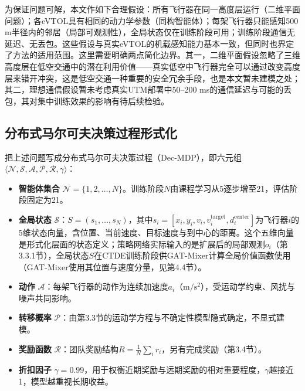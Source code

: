 \documentclass[12pt,a4paper,UTF8]{ctexart}
\begin{document}
为保证问题可解，本文作如下合理假设：所有飞行器在同一高度层运行（二维平面问题）；各eVTOL具有相同的动力学参数（同构智能体）；每架飞行器只能感知500 m半径内的邻居（局部可观测性），全局状态仅在训练阶段可用；训练阶段通信无延迟、无丢包。这些假设与真实eVTOL的机载感知能力基本一致，但同时也界定了方法的适用范围。这里需要明确两点简化边界。其一，二维平面假设忽略了三维高度层在低空交通中的潜在利用价值——真实低空中飞行器完全可以通过改变高度层来错开冲突，这是低空交通一种重要的安全冗余手段，也是本文暂未建模之处；其二，理想通信假设暂未考虑真实UTM部署中50--200 ms的通信延迟与可能的丢包，其对集中训练效果的影响有待后续检验。

\subsection{分布式马尔可夫决策过程形式化}

把上述问题写成分布式马尔可夫决策过程（Dec-MDP）\cite{ref41}，即六元组$\langle \mathcal{N}, \allowbreak \mathcal{S}, \allowbreak \mathcal{A}, \allowbreak \mathcal{P}, \allowbreak \mathcal{R}, \allowbreak \gamma \rangle$：

\begin{itemize}
    \item \textbf{智能体集合} $\mathcal{N} = \{1, 2, \ldots, N\}$。训练阶段$N$由课程学习从5逐步增至21，评估阶段固定为21。
    \item \textbf{全局状态} $\mathcal{S}$：$S = (s_1, \ldots, s_N)$，其中$s_i = [x_i, y_i, v_i, v_i^{\text{target}}, d_i^{\text{center}}]$为飞行器$i$的5维状态向量，含位置、当前速度、目标速度与到中心的距离。这个五维向量是形式化层面的状态定义；策略网络实际输入的是扩展后的局部观测$o_i$（第3.3.1节），全局状态$S$在CTDE训练阶段供GAT-Mixer计算全局价值函数使用（GAT-Mixer使用其位置与速度分量，见第4.4节）。
    \item \textbf{动作} $\mathcal{A}$：每架飞行器的动作为连续加速度$a_i$（$\mathrm{m/s^2}$），受运动学约束、风扰与噪声共同影响。
    \item \textbf{转移概率} $\mathcal{P}$：由第3.3节的运动学方程与不确定性模型隐式确定，不显式建模。
    \item \textbf{奖励函数} $\mathcal{R}$：团队奖励结构$R = \frac{1}{N}\sum_i r_i$，另有完成奖励（第3.4节）。
    \item \textbf{折扣因子} $\gamma = 0.99$，用于权衡近期奖励与远期奖励的相对重要程度，$\gamma$越接近1，模型越重视长期收益。
\end{itemize}
\end{document}
